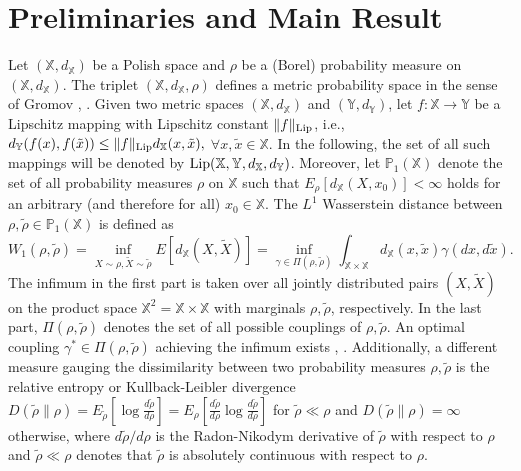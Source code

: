 \documentclass[twoside,11pt]{article}
\begin{document}
\section{Preliminaries and Main Result}


Let $(\mathbb{X},d_{\mathbb{X}})$ be a Polish space and $\rho$ be a (Borel) probability measure on $(\mathbb{X},d_{\mathbb{X}})$. The triplet  $(\mathbb{X},d_{\mathbb{X}},\rho)$ defines a metric probability space in the sense of Gromov \cite{rs13}, \cite{g07}. Given two metric spaces $(\mathbb{X}, d_{\mathbb{X}})$ and $(\mathbb{Y}, d_{\mathbb{Y}})$, let $f:\mathbb{X}\rightarrow \mathbb{Y}$ be a Lipschitz mapping with Lipschitz constant $\|f\|_{\rm Lip}$, i.e., $d_{\mathbb{Y}}(f(x),f(\tilde{x}))\leq \|f\|_{\rm Lip} d_{\mathbb{X}}(x,\tilde{x}),$ $\forall x,\tilde{x}\in \mathbb{X}$. In the following, the set of all such mappings will be denoted by ${\rm Lip}(\mathbb{X},\mathbb{Y},d_{\mathbb{X}},d_{\mathbb{Y}})$. Moreover,  let $\mathbb{P}_{1}(\mathbb{X})$ denote the set of all probability measures $\rho$ on $\mathbb{X}$ such that $E_{\rho}[d_{\mathbb{X}}(X,x_0)]<\infty$ holds for an arbitrary (and therefore for all) $x_0\in \mathbb{X}$. The $L^1$ Wasserstein distance between $\rho,\tilde{\rho}\in \mathbb{P}_1(\mathbb{X})$ is defined as
\begin{equation}\label{eq:defin1}
W_{1}(\rho,\tilde{\rho})=\inf_{X\sim \rho,\tilde{X}\sim \tilde{\rho}}E[d_{\mathbb{X}}(X,\tilde{X})]=\inf_{\gamma\in \Pi(\rho,\tilde{\rho})}\int_{\mathbb{X}\times \mathbb{X}}d_{\mathbb{X}}(x,\tilde{x})\gamma(dx,d\tilde{x}).
\end{equation}
The infimum in the first part is taken over all jointly distributed pairs $(X,\tilde{X})$ on the product space $\mathbb{X}^2=\mathbb{X}\times \mathbb{X}$ with marginals $\rho,\tilde{\rho}$, respectively. In the last part, $\Pi(\rho,\tilde{\rho})$ denotes the set of all possible couplings of $\rho,\tilde{\rho}$. An optimal coupling $\gamma^{*}\in \Pi(\rho,\tilde{\rho})$ achieving the infimum exists \cite{rs13}, \cite{v08}. Additionally, a different measure gauging the dissimilarity between two probability measures $\rho,\tilde{\rho}$ is the relative entropy or Kullback-Leibler divergence 
$
D(\tilde{\rho}\| \rho)=E_{\tilde{\rho}}\left[\log \frac{d\tilde{\rho}}{d\rho}\right]=E_{\rho}\left[\frac{d\tilde{\rho}}{d\rho}\log \frac{d\tilde{\rho}}{d\rho}\right]
$
for $\tilde{\rho}\ll \rho$ and $D(\tilde{\rho}\| \rho)=\infty$ otherwise, where $d\tilde{\rho}/d\rho$ is the Radon-Nikodym derivative of $\tilde{\rho}$ with respect to $\rho$ and $\tilde{\rho}\ll \rho$ denotes that $\tilde{\rho}$ is absolutely continuous with respect to $\rho$. 
\end{document}
